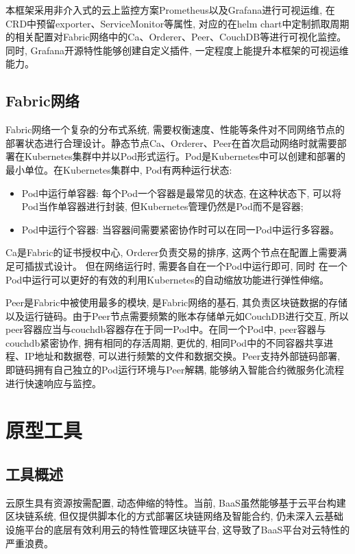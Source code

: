 本框架采用非介入式的云上监控方案Prometheus以及Grafana进行可视运维, 在CRD中预留exporter、ServiceMonitor等属性, 对应的在helm chart中定制抓取周期的相关配置对Fabric网络中的Ca、Orderer、Peer、CouchDB等进行可视化监控。同时, Grafana开源特性能够创建自定义插件, 一定程度上能提升本框架的可视运维能力。


\subsection{Fabric网络}

Fabric网络一个复杂的分布式系统, 需要权衡速度、性能等条件对不同网络节点的部署状态进行合理设计。静态节点Ca、Orderer、Peer在首次启动网络时就需要部署在Kubernetes集群中并以Pod形式运行。Pod是Kubernetes中可以创建和部署的最小单位。在Kubernetes集群中, Pod有两种运行状态:

\begin{itemize}[itemindent=2em]
    \item Pod中运行单容器: 每个Pod一个容器是最常见的状态, 在这种状态下, 可以将Pod当作单容器进行封装, 但Kubernetes管理仍然是Pod而不是容器;

    \item Pod中运行个容器: 当容器间需要紧密协作时可以在同一Pod中运行多容器。
\end{itemize}

Ca是Fabric的证书授权中心, Orderer负责交易的排序, 这两个节点在配置上需要满足可插拔式设计。 但在网络运行时, 需要各自在一个Pod中运行即可, 同时 在一个Pod中运行可以更好的有效的利用Kubernetes的自动缩放功能进行弹性伸缩。

Peer是Fabric中被使用最多的模块, 是Fabric网络的基石, 其负责区块链数据的存储以及运行链码。由于Peer节点需要频繁的账本存储单元如CouchDB进行交互, 所以peer容器应当与couchdb容器存在于同一Pod中。在同一个Pod中, peer容器与couchdb紧密协作, 拥有相同的存活周期, 更优的, 相同Pod中的不同容器共享进程、IP地址和数据卷, 可以进行频繁的文件和数据交换。Peer支持外部链码部署, 即链码拥有自己独立的Pod运行环境与Peer解耦, 能够纳入智能合约微服务化流程\cite{zhangfuli2021smartcontract}进行快速响应与监控。 

\section{原型工具}

\subsection{工具概述}

云原生具有资源按需配置, 动态伸缩的特性。当前, BaaS虽然能够基于云平台构建区块链系统, 但仅提供脚本化的方式部署区块链网络及智能合约, 仍未深入云基础设施平台的底层有效利用云的特性管理区块链平台, 这导致了BaaS平台对云特性的严重浪费。

